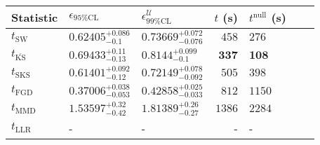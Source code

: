 \begin{tabular}{l|llr|llr}
	Statistic & $\epsilon_{95\%\mathrm{CL}}$ & $\epsilon^    {\mathcal{U}}_{99\%\mathrm{CL}}$ & $t$ (s) & $t^{\mathrm{null}}$ (s) \\
	\midrule
	$t_{\mathrm{SW}}$ & $0.62405_{-0.1}^{+0.086}$ & $0.73669_{-0.076}^{+0.072}$ & $458$ & $276$ \\
	$t_{\overline{\mathrm{KS}}}$ & $0.69433_{-0.13}^{+0.11}$ & $0.8144_{-0.1}^{+0.099}$ & ${\mathbf{337}}$ & ${\mathbf{108}}$ \\
	$t_{\mathrm{SKS}}$ & $0.61401_{-0.12}^{+0.092}$ & $0.72149_{-0.092}^{+0.078}$ & $505$ & $398$ \\
	$t_{\mathrm{FGD}}$ & ${\mathbf{0.37006_{-0.053}^{+0.038}}}$ & ${\mathbf{0.42858_{-0.033}^{+0.025}}}$ & $812$ & $1150$ \\
	$t_{\mathrm{MMD}}$ & $1.53597_{-0.42}^{+0.32}$ & $1.81389_{-0.27}^{+0.26}$ & $1386$ & $2284$ \\
	$t_{\mathrm{LLR}}$ & - & - & - & - \\
	\bottomrule
\end{tabular}